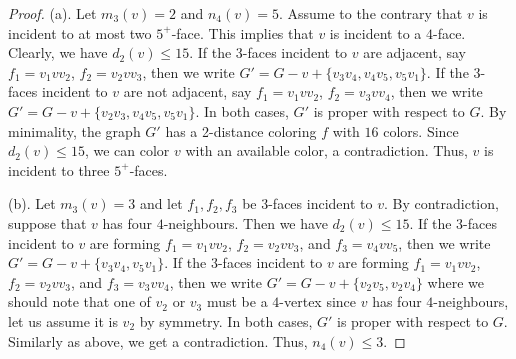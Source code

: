 \documentclass[12pt, reqno]{amsart}
\theoremstyle{plain}
\theoremstyle{definition}
\numberwithin{equation}{section}
\begin{document}
\begin{proof} 
%
(a). Let $m_3(v)=2$ and $n_4(v)=5$. Assume to the contrary that $v$ is incident to at most two $5^+$-face. This implies that $v$ is incident to a $4$-face. Clearly, we have $d_2(v)\leq 15$.
If the $3$-faces incident to $v$ are adjacent, say $f_1=v_1vv_2$, $f_2=v_2vv_3$, then we write $G'=G-v+\{v_3v_4,v_4v_5,v_5v_1\}$. If the $3$-faces incident to $v$ are not adjacent, say $f_1=v_1vv_2$, $f_2=v_3vv_4$, then we write $G'=G-v+\{v_2v_3,v_4v_5,v_5v_1\}$. In both cases, $G'$ is proper with respect to $G$. By minimality, the graph $G'$ has a 2-distance coloring $f$ with $16$ colors. Since  $d_2(v)\leq 15$, we can color $v$ with an available color, a contradiction. Thus, $v$ is incident to three $5^+$-faces.



(b). Let $m_3(v)=3$ and  let $f_1,f_2,f_3$ be $3$-faces incident to $v$. By contradiction, suppose that  $v$ has four $4$-neighbours. Then we have $d_2(v)\leq 15$.
If the $3$-faces  incident to $v$ are forming $f_1=v_1vv_2$, $f_2=v_2vv_3$, and $f_3=v_4vv_5$, then we write $G'=G-v+\{v_3v_4,v_5v_1\}$. If the $3$-faces incident to $v$ are forming $f_1=v_1vv_2$, $f_2=v_2vv_3$, and $f_3=v_3vv_4$, then we write $G'=G-v+\{v_2v_5,v_2v_4\}$ where we should note that one of $v_2$ or $v_3$ must be a $4$-vertex since $v$ has four $4$-neighbours, let us assume it is $v_2$ by symmetry. In both cases, $G'$ is proper with respect to $G$.
Similarly as above, we get a contradiction. Thus, $n_4(v)\leq 3$. 
\end{proof}
\end{document}
